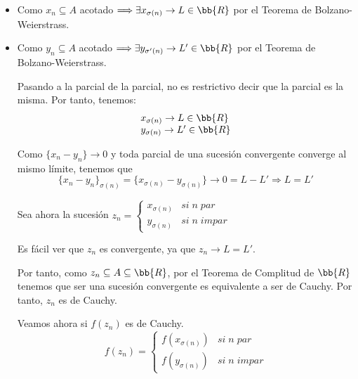 \begin{ejercicio}
\begin{description}
        \begin{itemize}
            \item Como $x_n \subseteq A$ acotado $\Longrightarrow \exists x_{\sigma (n)} \to L\in \bb{R}$ por el Teorema de Bolzano-Weierstrass.

            \item Como $y_n \subseteq A$ acotado $\Longrightarrow \exists y_{\sigma' (n)} \to L'\in \bb{R}$ por el Teorema de Bolzano-Weierstrass.
            
            Pasando a la parcial de la parcial, no es restrictivo decir que la parcial es la misma. Por tanto, tenemos:
            \begin{equation*}
                \begin{array}{l}
                    x_{\sigma (n)} \to L\in \bb{R} \\
                    y_{\sigma (n)} \to L'\in \bb{R}
                \end{array}
            \end{equation*}

            Como $\{x_n - y_n\}\to 0$ y toda parcial de una sucesión convergente converge al mismo límite, tenemos que
            $$\{x_n - y_n\}_{\sigma (n)}=\{x_{\sigma (n)} - y_{\sigma (n)}\} \longrightarrow 0 = L-L' \Longrightarrow L=L'$$

            Sea ahora la sucesión $z_n=\left\{ \begin{array}{cc}
                x_{\sigma (n)} & si\;n\;par \\
                y_{\sigma (n)} & si\;n\;impar
            \end{array} \right.$
            
            Es fácil ver que $z_n$ es convergente, ya que $z_n\to L=L'$.
            
            Por tanto, como $z_n\subseteq A\subseteq \bb{R}$, por el Teorema de Complitud de $\bb{R}$ tenemos que ser una sucesión convergente es equivalente a ser de Cauchy. Por tanto, $z_n$ es de Cauchy.

            Veamos ahora si $f(z_n)$ es de Cauchy.
            $$f(z_n)=\left\{ \begin{array}{cc}
                f(x_{\sigma (n)}) & si\;n\;par \\
                f(y_{\sigma (n)}) & si\;n\;impar
            \end{array} \right.$$


\end{itemize}
\end{description}
\end{ejercicio}
